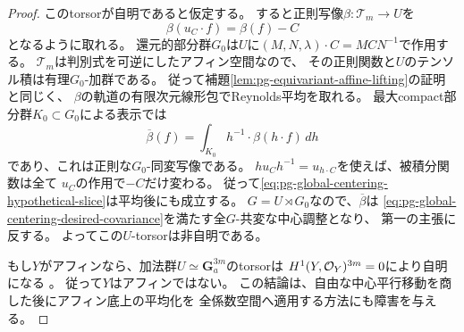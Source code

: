 \begin{proof}
このtorsorが自明であると仮定する。
すると正則写像$\beta:\mathcal T_m\to U$を
\begin{equation}
 \beta(u_C\cdot f)=\beta(f)-C
 \label{eq:pg-global-centering-hypothetical-slice}
\end{equation}
となるように取れる。
還元的部分群$G_0$は$U$に$(M,N,\lambda)\cdot C=MCN^{-1}$で作用する。
$\mathcal T_m$は判別式を可逆にしたアフィン空間なので、
その正則関数と$U$のテンソル積は有理$G_0$-加群である。
従って補題\ref{lem:pg-equivariant-affine-lifting}の証明と同じく、
$\beta$の軌道の有限次元線形包でReynolds平均を取れる。
最大compact部分群$K_0\subset G_0$による表示では
\begin{equation}
 \overline\beta(f)
 =\int_{K_0} h^{-1}\!\cdot\beta(h\cdot f)\,dh
 \label{eq:pg-global-centering-reynolds-slice}
\end{equation}
であり、これは正則な$G_0$-同変写像である。
$h u_C h^{-1}=u_{h\cdot C}$を使えば、被積分関数は全て
$u_C$の作用で$-C$だけ変わる。
従って\eqref{eq:pg-global-centering-hypothetical-slice}は平均後にも成立する。
$G=U\rtimes G_0$なので、$\overline\beta$は
\eqref{eq:pg-global-centering-desired-covariance}を満たす全$G$-共変な中心調整となり、
第一の主張に反する。
よってこの$U$-torsorは非自明である。

もし$Y$がアフィンなら、加法群$U\simeq\mathbf G_a^{3m}$のtorsorは
$H^1(Y,\mathcal O_Y)^{3m}=0$により自明になる
\cite[Theorem~59.22.4, Tag~\texttt{03OY}]{PStacks}。
従って$Y$はアフィンではない。
この結論は、自由な中心平行移動を商した後にアフィン底上の平均化を
全係数空間へ適用する方法にも障害を与える。
\end{proof}
